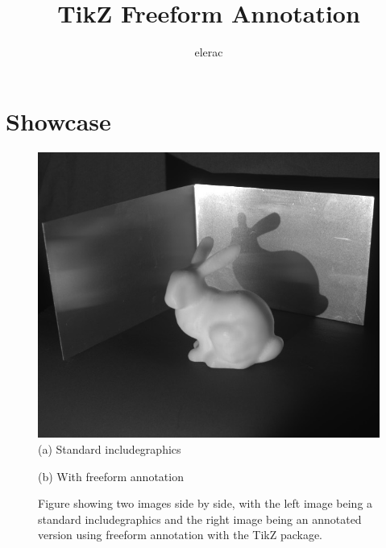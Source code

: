 \documentclass{article}
\title{TikZ Freeform Annotation}
\author{elerac}
\date{}
\begin{document}
\maketitle

\section{Showcase}

\begin{figure}[tbh]
    \centering
    \begin{minipage}{0.5\hsize}
        \centering
        \includegraphics[width=0.98\hsize]{figures/bunny.jpg}
        (a) Standard includegraphics
    \end{minipage}%
    \begin{minipage}{0.5\hsize}
        \centering
        \scalebox{0.98}{
            
            }
        (b) With freeform annotation
    \end{minipage}%
    \caption{Figure showing two images side by side, with the left image being a standard includegraphics and the right image being an annotated version using freeform annotation with the TikZ package.}
\end{figure}
\end{document}
